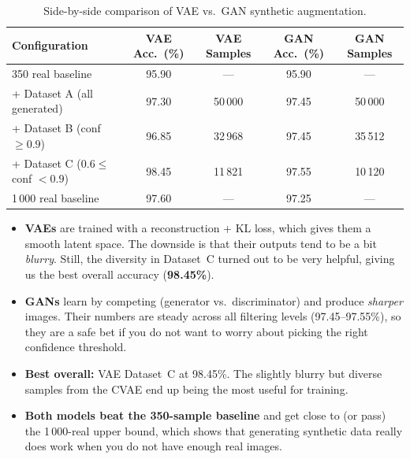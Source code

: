 \documentclass[12pt, a4paper]{article}
\renewcommand{\arraystretch}{1.12}
\begin{document}
\begin{table}[H]
\centering
\renewcommand{\arraystretch}{1.3}
\begin{tabular}{l c c c c}
\toprule
\textbf{Configuration} & \textbf{VAE Acc.\ (\%)} & \textbf{VAE Samples}
                        & \textbf{GAN Acc.\ (\%)} & \textbf{GAN Samples} \\
\midrule
350 real baseline                     & 95.90  & --- & 95.90  & --- \\
+ Dataset A (all generated)           & 97.30  & 50\,000 & 97.45  & 50\,000 \\
+ Dataset B (conf $\geq 0.9$)         & 96.85  & 32\,968 & 97.45  & 35\,512 \\
+ Dataset C ($0.6 \leq$ conf $< 0.9$) & 98.45  & 11\,821 & 97.55  & 10\,120 \\
\midrule
1\,000 real baseline                  & 97.60  & --- & 97.25  & --- \\
\bottomrule
\end{tabular}
\caption{Side-by-side comparison of VAE vs.\ GAN synthetic augmentation.}
\label{tab:comparison}
\end{table}

\begin{itemize}
    \item \textbf{VAEs} are trained with a reconstruction + KL loss, which gives them a
          smooth latent space.  The downside is that their outputs tend to be a bit
          \emph{blurry}.  Still, the diversity in Dataset~C turned out to be very
          helpful, giving us the best overall accuracy (\textbf{98.45\%}).

    \item \textbf{GANs} learn by competing (generator vs.\ discriminator) and produce
          \emph{sharper} images.  Their numbers are steady across all filtering levels
          (97.45--97.55\%), so they are a safe bet if you do not want to worry about
          picking the right confidence threshold.

    \item \textbf{Best overall:} VAE Dataset~C at 98.45\%.  The slightly blurry but
          diverse samples from the CVAE end up being the most useful for training.

    \item \textbf{Both models beat the 350-sample baseline} and get close to (or pass)
          the 1\,000-real upper bound, which shows that generating synthetic data
          really does work when you do not have enough real images.
\end{itemize}
\end{document}
